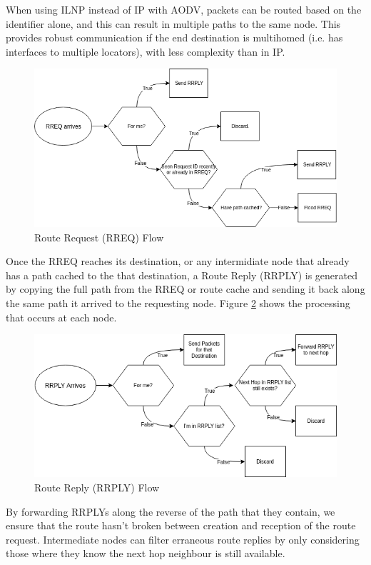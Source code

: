\documentclass[12pt]{article}
\begin{document}
When using ILNP instead of IP with AODV, packets can be routed based on the identifier alone, and this can result in multiple paths to the same node. This provides robust communication if the end destination is multihomed (i.e. has interfaces to multiple locators), with less complexity than in IP. 

\begin{figure}[!ht]
	\centering
	\includegraphics[width=\linewidth]{images/rreqflow}
	\caption{Route Request (RREQ) Flow}
	\label{fig:rreqflow}
\end{figure}

Once the RREQ reaches its destination, or any intermidiate node that already has a path cached to the that destination, a Route Reply (RRPLY) is generated by copying the full path from the RREQ or route cache and sending it back along the same path it arrived to the requesting node. Figure \ref{fig:rrplyflow} shows the processing that occurs at each node.


\begin{figure}[h]
	\centering
	\includegraphics[width=\linewidth]{images/rrplyflow}
	\caption{Route Reply (RRPLY) Flow}
	\label{fig:rrplyflow}
\end{figure}

By forwarding RRPLYs along the reverse of the path that they contain, we ensure that the route hasn't broken between creation and reception of the route request. Intermediate nodes can filter erraneous route replies by only considering those where they know the next hop neighbour is still available.
\end{document}
